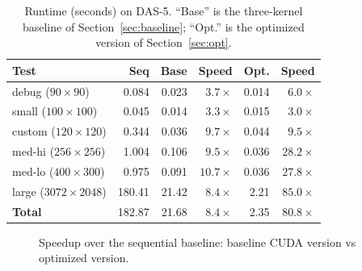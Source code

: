 \documentclass[sigconf, nonacm, review]{acmart}
\begin{document}
\begin{table}[h]
  \caption{Runtime (seconds) on DAS-5. ``Base'' is the
    three-kernel baseline of
    Section~\ref{sec:baseline}; ``Opt.'' is the optimized version of
  Section~\ref{sec:opt}.}
  \label{tab:results}
  \small
  \begin{tabular}{lrrrrr}
    \toprule
    Test & Seq & Base & Speed & Opt. & Speed \\
    \midrule
    debug ($90{\times}90$)            & 0.084   & 0.023  & $3.7\times$  & 0.014  & $6.0\times$  \\
    small ($100{\times}100$)          & 0.045   & 0.014  & $3.3\times$  & 0.015  & $3.0\times$  \\
    custom ($120{\times}120$)         & 0.344   & 0.036  & $9.7\times$  & 0.044  & $9.5\times$  \\
    med-hi ($256{\times}256$)         & 1.004   & 0.106  & $9.5\times$  & 0.036  & $28.2\times$ \\
    med-lo ($400{\times}300$)         & 0.975   & 0.091  & $10.7\times$ & 0.036  & $27.8\times$ \\
    large ($3072{\times}2048$)        & 180.41  & 21.42  & $8.4\times$  & 2.21   & $85.0\times$ \\
    \midrule
    \textbf{Total}                    & 182.87  & 21.68  & $\mathbf{8.4\times}$ & 2.35 & $\mathbf{80.8\times}$ \\
    \bottomrule
  \end{tabular}
\end{table}

\begin{figure}[h]
  \centering
  \caption{Speedup over the sequential baseline: baseline CUDA
  version vs optimized version.}
  \label{fig:speedup}
\end{figure}
\end{document}
